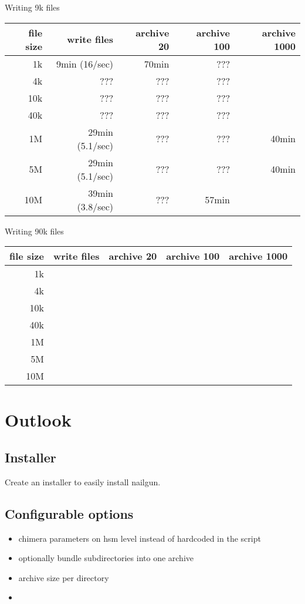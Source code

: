 \documentclass[a4paper,8pt]{scrartcl}
\begin{document}
Writing 9k files
\begin{tabular}{|r|r|r|r|r|}
  \hline
  file size & write files  & archive 20 & archive 100 & archive 1000 \\
  \hline
  1k        &  9min (16/sec)  &      70min &         ??? &              \\
  \hline
  4k & ??? & ??? & ??? & & \\
  \hline
  10k & ??? & ??? & ??? & & \\
  \hline
  40k & ??? & ??? & ??? & & \\
  \hline
  1M        & 29min (5.1/sec) & ???        &         ??? &        40min \\
  \hline
  5M        & 29min (5.1/sec) & ???        &         ??? &        40min \\
  \hline
  10M       & 39min (3.8/sec) &        ??? &       57min &              \\
  \hline
\end{tabular}

Writing 90k files
\begin{tabular}{|r|r|r|r|r|}
  \hline
  file size & write files  & archive 20 & archive 100 & archive 1000 \\
  \hline
  1k        & & & & \\
  \hline
  4k        & & & & \\
  \hline
  10k       & & & & \\
  \hline
  40k       & & & & \\
  \hline
  1M        & & & & \\
  \hline
  5M        & & & & \\
  \hline
  10M       & & & & \\
  \hline
\end{tabular}

\section{Outlook}

\subsection{Installer}
Create an installer to easily install nailgun.

\subsection{Configurable options}
\begin{itemize}
  \item chimera parameters on hsm level instead of hardcoded in the script
  \item optionally bundle subdirectories into one archive
  \item archive size per directory
  \item 
\end{itemize}
\end{document}
